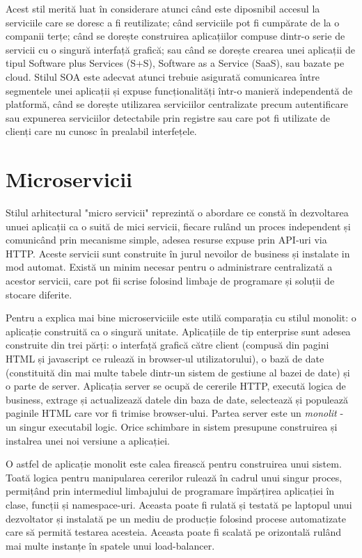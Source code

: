 \documentclass[12pt, a4paper, oneside, romanian]{teza-upb}
\begin{document}
Acest stil merită luat în considerare atunci când este diposnibil accesul la serviciile care se doresc a fi reutilizate; când serviciile pot fi cumpărate de la o companii terțe; când se dorește construirea aplicațiilor compuse dintr-o serie de servicii cu o singură interfață grafică; sau când se dorește crearea unei aplicații de tipul Software plus Services (S+S), Software as a Service (SaaS), sau bazate pe cloud. Stilul SOA este adecvat atunci trebuie asigurată comunicarea între segmentele unei aplicații și expuse funcționalități într-o manieră independentă de platformă, când se dorește utilizarea serviciilor centralizate precum autentificare sau expunerea serviciilor detectabile prin registre sau care pot fi utilizate de clienți care nu cunosc în prealabil interfețele.

\chapter{Microservicii}

Stilul arhitectural "micro servicii" reprezintă o abordare ce constă în dezvoltarea unuei aplicații ca o suită de mici servicii, fiecare rulând un proces independent și comunicând prin mecanisme simple, adesea resurse expuse prin API-uri via HTTP. Aceste servicii sunt construite în jurul nevoilor de business și instalate in mod automat. Există un minim necesar pentru o administrare centralizată a acestor servicii, care pot fii scrise folosind limbaje de programare și soluții de stocare diferite.

Pentru a explica mai bine microserviciile este utilă comparația cu stilul monolit: o aplicație construită ca o singură unitate. Aplicațiile de tip enterprise sunt adesea construite din trei părți: o interfață grafică către client (compusă din pagini HTML și javascript ce rulează in browser-ul utilizatorului), o bază de date (constituită din mai multe tabele dintr-un sistem de gestiune al bazei de date) și o parte de server. Aplicația server se ocupă de cererile HTTP, execută logica de business, extrage și actualizează datele din baza de date, selectează și populează paginile HTML care vor fi trimise browser-ului. Partea server este un \textit{monolit} - un singur executabil logic. Orice schimbare in sistem presupune construirea și instalrea unei noi versiune a aplicației.

O astfel de aplicație monolit este calea firească pentru construirea unui sistem. Toată logica pentru manipularea cererilor rulează în cadrul unui singur proces, permițând prin intermediul limbajului de programare împărțirea aplicației în clase, funcții și namespace-uri. Aceasta poate fi rulată și testată pe laptopul unui dezvoltator și instalată pe un mediu de producție folosind procese automatizate care să permită testarea acesteia. Aceasta poate fi scalată pe orizontală rulând mai multe instanțe în spatele unui load-balancer.
\end{document}
